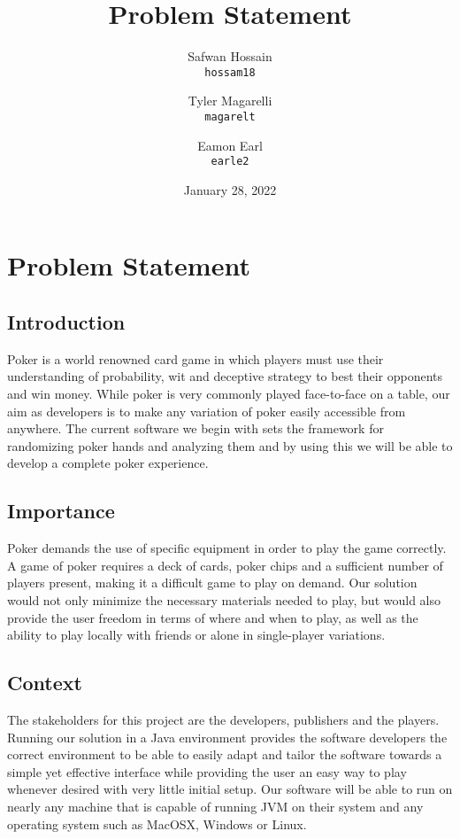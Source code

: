 \documentclass{article}
\title{Problem Statement}
\author{
  Safwan Hossain\\
  \texttt{hossam18}\\
  \and
  Tyler Magarelli\\
  \texttt{magarelt}\\
  \and
  Eamon Earl\\
  \texttt{earle2}
}
\date{January 28, 2022}
\begin{document}
\maketitle
\newpage

\section*{Problem Statement}
\subsection*{Introduction}
    Poker is a world renowned card game in which players must use their understanding of probability, wit and deceptive strategy to best their opponents and win money. While poker is very commonly played face-to-face on a table, our aim as developers is to make any variation of poker easily accessible from anywhere. The current software we begin with sets the framework for randomizing poker hands and analyzing them and by using this we will be able to develop a complete poker experience.
\subsection*{Importance}
    Poker demands the use of specific equipment in order to play the game correctly. A game of poker requires a deck of cards, poker chips and a sufficient number of players present, making it a difficult game to play on demand. Our solution would not only minimize the necessary materials needed to play, but would also provide the user freedom in terms of where and when to play, as well as the ability to play locally with friends or alone in single-player variations.

\subsection*{Context}
    The stakeholders for this project are the developers, publishers and the players. 
    \\
    Running our solution in a Java environment provides the software developers the correct environment to be able to easily adapt and tailor the software towards a simple yet effective interface while providing the user an easy way to play whenever desired with very little initial setup. Our software will be able to run on nearly any machine that is capable of running JVM on their system and any operating system such as MacOSX, Windows or Linux.
\end{document}
